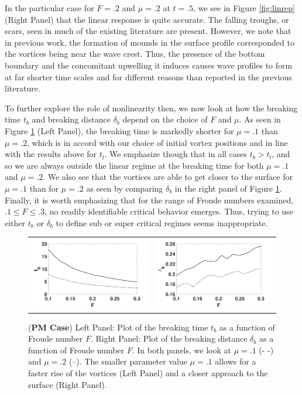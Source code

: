 \documentclass[a4paper,11pt]{article}
\begin{document}
In the particular case for $F=.2$ and $\mu=.2$ at $t=.5$, we see in Figure \ref{fig:linrep} (Right Panel) that the linear response is quite accurate.  The falling troughs, or scars, seen in much of the existing literature \cite{marcus,tryggvason} are present.  However, we note that in previous work, the formation of mounds in the surface profile corresponded to the vortices being near the wave crest.  Thus, the presence of the bottom boundary and the concomitant upwelling it induces causes wave profiles to form at far shorter time scales and for different reasons than reported in the previous literature.  

To further explore the role of nonlinearity then, we now look at how the breaking time $t_{b}$ and breaking distance $\delta_{b}$ depend on the choice of $F$ and $\mu$.  As seen in Figure \ref{fig:froudecomp} (Left Panel), the breaking time is markedly shorter for $\mu=.1$ than $\mu=.2$, which is in accord with our choice of initial vortex positions and in line with the results above for $t_{l}$.  We emphasize though that in all cases $t_{b}>t_{l}$, and so we are always outside the linear regime at the breaking time for both $\mu=.1$ and $\mu=.2$.  We also see that the vortices are able to get closer to the surface for $\mu=.1$ than for $\mu=.2$ as seen by comparing $\delta_{b}$ in the right panel of Figure \ref{fig:froudecomp}.  Finally, it is worth emphasizing that for the range of Froude numbers examined, $.1\leq F \leq .3$, no readily identifiable critical behavior emerges.  Thus, trying to use either $t_{b}$ or $\delta_{b}$ to define sub or super critical regimes seems inappropriate.  
%
\begin{figure}[!h]
\centering
\begin{tabular}{cc}
\includegraphics[width=.5\textwidth]{froude_comp_pm} & 
\includegraphics[width=.5\textwidth]{zmb_pm}
\end{tabular}
\caption{\small ({\bf PM Case}) Left Panel: Plot of the breaking time $t_{b}$ as a function of Froude number $F$. Right Panel: Plot of the breaking distance $\delta_{b}$ as a function of Froude number $F$.  In both panels, we look at $\mu=.1$ (- -) and $\mu=.2$ (--). The smaller parameter value $\mu=.1$ allows for a faster rise of the vortices (Left Panel) and a closer approach to the surface (Right Panel).}
\label{fig:froudecomp}
\end{figure}
\end{document}
